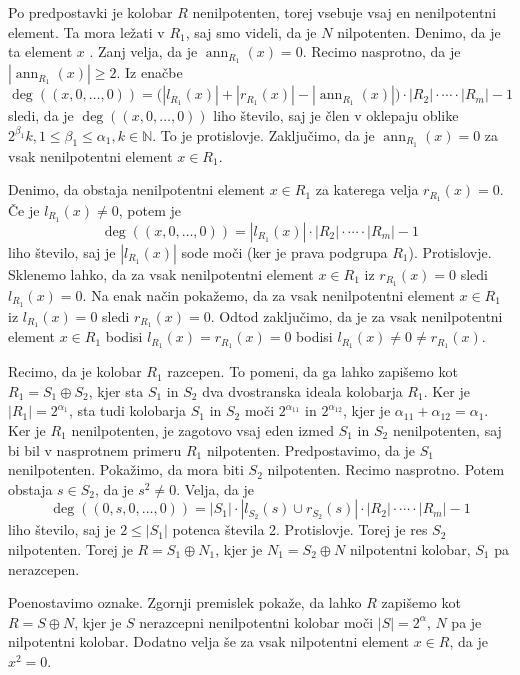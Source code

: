 \documentclass[a4paper, 12pt]{amsart}
\theoremstyle{definition} %
\theoremstyle{plain} %
\newcommand{\N}{\mathbb N}
\DeclareMathOperator{\ann}{ann}
\begin{document}
Po predpostavki je kolobar $R$ nenilpotenten, torej vsebuje vsaj en nenilpotentni element. Ta mora ležati v $R_1$, saj smo videli, da je $N$ nilpotenten. Denimo, da je ta element $x$ . Zanj velja, da je $\ann_{R_1}(x) = 0$. Recimo nasprotno, da je $|\ann_{R_1}(x)|\ge 2$. Iz enačbe 
$$
\deg ((x,0,\dots,0)) = \big( |l_{R_1}(x) | + |r_{R_1}(x)| - |\ann_{R_1}(x)| \big) \cdot |R_2| \cdot \cdots \cdot |R_m| - 1
$$
sledi, da je $\deg((x,0,\dots,0))$ liho število, saj je člen v oklepaju oblike $2^{\beta_1}k, 1\le \beta_1 \le \alpha_1, k\in \N$. To je protislovje. Zaključimo, da je $\ann_{R_1}(x) = 0$ za vsak nenilpotentni element $x\in R_1$.

Denimo, da obstaja nenilpotentni element $x\in R_1$ za katerega velja $r_{R_1}(x) = 0$. Če je $l_{R_1}(x) \neq 0$, potem je 
$$
\deg((x,0,\dots,0)) = |l_{R_1}(x)| \cdot |R_2| \cdot \cdots  \cdot |R_m| -1
$$  
liho število, saj je $|l_{R_1}(x)|$ sode moči (ker je prava podgrupa $R_1$). Protislovje. Sklenemo lahko, da za vsak nenilpotentni element $x\in R_1$ iz $r_{R_1}(x) = 0$ sledi $l_{R_1}(x) = 0$. Na enak način pokažemo, da za vsak nenilpotentni element $x\in R_1$ iz $l_{R_1}(x) = 0$ sledi $r_{R_1}(x) = 0$. Odtod zaključimo, da je za vsak nenilpotentni element $x\in R_1$ bodisi $l_{R_1}(x) = r_{R_1}(x) = 0$ bodisi $l_{R_1}(x) \neq 0 \neq r_{R_1}(x)$.

Recimo, da je kolobar $R_1$ razcepen. To pomeni, da ga lahko zapišemo kot $R_1 = S_1 \oplus S_2$, kjer sta $S_1$ in $S_2$ dva dvostranska ideala kolobarja $R_1$. Ker je $|R_1| = 2^{\alpha_1}$, sta tudi kolobarja $S_1$ in $S_2$ moči $2^{\alpha_{11}}$ in $2^{\alpha_{12}}$, kjer je $\alpha_{11} + \alpha_{12} = \alpha_1$. Ker je $R_1$ nenilpotenten, je zagotovo vsaj eden izmed $S_1$ in $S_2$ nenilpotenten, saj bi bil v nasprotnem primeru $R_1$ nilpotenten. Predpostavimo, da je $S_1$ nenilpotenten. Pokažimo, da mora biti $S_2$ nilpotenten. Recimo nasprotno. Potem obstaja $s  \in S_2$, da je $s^2 \neq 0$. Velja, da je 
$$
\deg((0,s,0,\dots,0)) = |S_1|\cdot |l_{S_2}(s) \cup r_{S_2}(s)| \cdot |R_2| \cdot \cdots \cdot |R_m| - 1
$$
liho število, saj je $2\le |S_1|$ potenca števila 2. Protislovje. Torej je res $S_2$ nilpotenten. Torej je $R= S_1 \oplus N_1$, kjer je $N_1 = S_2\oplus N$ nilpotentni kolobar, $S_1$ pa nerazcepen.

Poenostavimo oznake. Zgornji premislek pokaže, da lahko $R$ zapišemo kot $R = S\oplus N$, kjer je $S$ nerazcepni nenilpotentni kolobar moči $|S| = 2^{\alpha}$, $N$ pa je nilpotentni kolobar. Dodatno velja še za vsak nilpotentni element $x\in R$, da je $x^2 = 0$.
\end{document}

